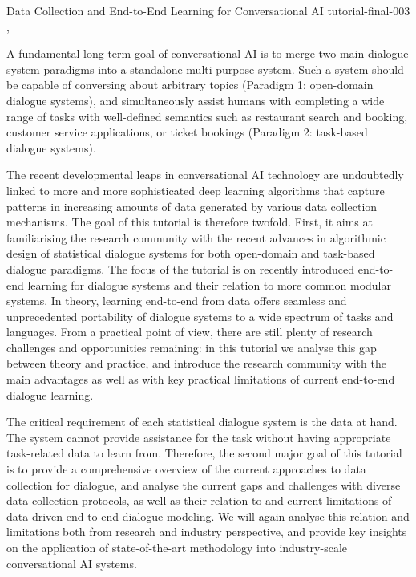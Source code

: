 \begin{tutorial}
  {Data Collection and End-to-End Learning for Conversational AI}
  {tutorial-final-003}
  {\daydateyear, \tutorialafternoontime}
  {\TutLocC}

A fundamental long-term goal of conversational AI is to merge two main dialogue system paradigms into a standalone multi-purpose system. Such a system should be capable of conversing about arbitrary topics (Paradigm 1: open-domain dialogue systems), and simultaneously assist humans with completing a wide range of tasks with well-defined semantics such as restaurant search and booking, customer service applications, or ticket bookings (Paradigm 2: task-based dialogue systems).

The recent developmental leaps in conversational AI technology are undoubtedly linked to more and more sophisticated deep learning algorithms that capture patterns in increasing amounts of data generated by various data collection mechanisms. The goal of this tutorial is therefore twofold. First, it aims at familiarising the research community with the recent advances in algorithmic design of statistical dialogue systems for both open-domain and task-based dialogue paradigms. The focus of the tutorial is on recently introduced end-to-end learning for dialogue systems and their relation to more common modular systems. In theory, learning end-to-end from data offers seamless and unprecedented portability of dialogue systems to a wide spectrum of tasks and languages. From a practical point of view, there are still plenty of research challenges and opportunities remaining: in this tutorial we analyse this gap between theory and practice, and introduce the research community with the main advantages as well as with key practical limitations of current end-to-end dialogue learning.

The critical requirement of each statistical dialogue system is the data at hand. The system cannot provide assistance for the task without having appropriate task-related data to learn from. Therefore, the second major goal of this tutorial is to provide a comprehensive overview of the current approaches to data collection for dialogue, and analyse the current gaps and challenges with diverse data collection protocols, as well as their relation to and current limitations of data-driven end-to-end dialogue modeling. We will again analyse this relation and limitations both from research and industry perspective, and provide key insights on the application of state-of-the-art methodology into industry-scale conversational AI systems.

\end{tutorial}
